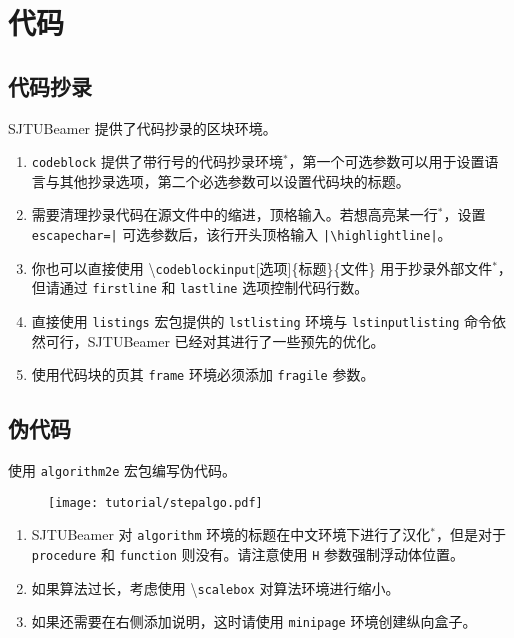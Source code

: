 \documentclass[
    UTF8,
    heading=true,
    12pt,
    a4paper
]{ctexrep}
\newenvironment{commentlist}{\begin{enumerate}\small}{\end{enumerate}}
\newcommand{\cmd}[1]{\textbackslash{}\texttt{#1}}
\newcommand{\env}[1]{\texttt{#1}}
\newcommand{\pkg}[1]{\texttt{#1}}
\newcommand{\opt}[1]{\texttt{#1}}
\def\themename{\textsf{SJTUBeamer}}
\begin{document}
\chapter{代码}

\section{代码抄录}

\themename{} 提供了代码抄录的区块环境。


\begin{commentlist}
  \item \env{codeblock} 提供了带行号的代码抄录环境$^*$，第一个可选参数可以用于设置语言与其他抄录选项，第二个必选参数可以设置代码块的标题。
  \item 需要清理抄录代码在源文件中的缩进，顶格输入。若想高亮某一行$^*$，设置 \verb"escapechar=|" 可选参数后，该行开头顶格输入 \verb"|\highlightline|"。
  \item 你也可以直接使用 \cmd{codeblockinput}[选项]\{标题\}\{文件\} 用于抄录外部文件$^*$，但请通过 \opt{firstline} 和 \opt{lastline} 选项控制代码行数。
  \item 直接使用 \pkg{listings} 宏包提供的 \env{lstlisting} 环境与 \env{lstinputlisting} 命令依然可行，\themename{} 已经对其进行了一些预先的优化。
  \item[\faExclamationTriangle] 使用代码块的页其 \env{frame} 环境必须添加 \opt{fragile} 参数。
\end{commentlist}

\section{伪代码}

使用 \pkg{algorithm2e} 宏包编写伪代码。

\begin{figure}[h]
  \centering
  \texttt{[image: tutorial/stepalgo.pdf]}
\end{figure}


\begin{commentlist}
  \item \themename{} 对 \env{algorithm} 环境的标题在中文环境下进行了汉化$^*$，但是对于 \env{procedure} 和 \env{function} 则没有。请注意使用 \texttt{H} 参数强制浮动体位置。
  \item 如果算法过长，考虑使用 \cmd{scalebox} 对算法环境进行缩小。
  \item 如果还需要在右侧添加说明，这时请使用 \env{minipage} 环境创建纵向盒子。
\end{commentlist}
\end{document}
